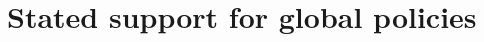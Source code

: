 \documentclass{nature}
\begin{document}







\section{Stated support for global policies}\label{subsec:stated_support}
\end{document}
